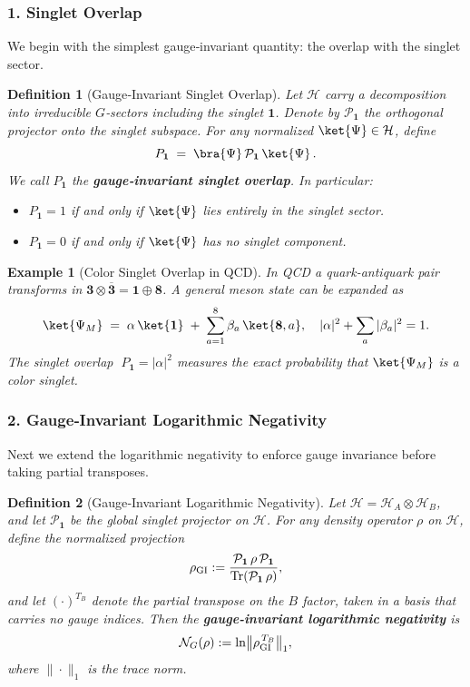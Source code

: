 \documentclass[12pt,a4paper]{article}
\newtheorem{definition}{Definition}
\newtheorem{example}{Example}
\begin{document}
\subsubsection*{1. Singlet Overlap}

We begin with the simplest gauge‐invariant quantity:
the overlap with the singlet sector.

\begin{definition}[Gauge‐Invariant Singlet Overlap]
	Let $\mathcal H$ carry a decomposition into irreducible $G$‐sectors including the singlet $\mathbf1$.
	Denote by $\mathcal P_{\mathbf1}$ the orthogonal projector onto the singlet subspace.
	For any normalized $\ket{\Psi}\in\mathcal H$, define
	\[
	P_{\mathbf1}\;=\;\bra{\Psi}\,\mathcal P_{\mathbf1}\,\ket{\Psi}\,.
	\]
	We call $P_{\mathbf1}$ the \textbf{gauge‐invariant singlet overlap}.
	In particular:
	\begin{itemize}
		\item $P_{\mathbf1}=1$ if and only if $\ket{\Psi}$ lies entirely in the singlet sector.
		
		\item $P_{\mathbf1}=0$ if and only if $\ket{\Psi}$ has no singlet component.
	\end{itemize}
\end{definition}


\begin{example}[Color Singlet Overlap in QCD]
	In QCD a quark-antiquark pair transforms in 
	$\mathbf3\otimes\overline{\mathbf3}=\mathbf1\oplus\mathbf8$.  
	A general meson state can be expanded as
	\[
	\ket{\Psi_M}
	\;=\;
	\alpha\,\ket{\mathbf1}
	\;+\;
	\sum_{a=1}^{8}\beta_{a}\,\ket{\mathbf8,a},
	\quad
	|\alpha|^2+\sum_a|\beta_a|^2=1.
	\]
	The singlet overlap
	$\;P_{\mathbf1}=|\alpha|^2$
	measures the exact probability that $\ket{\Psi_M}$ is a color singlet.
\end{example}



\subsubsection*{2. Gauge‐Invariant Logarithmic Negativity \cite{VidalWerner2002}}

Next we extend the logarithmic negativity to enforce gauge invariance before taking partial transposes.

\begin{definition}[Gauge‐Invariant Logarithmic Negativity]
	Let $\mathcal H=\mathcal H_A\otimes\mathcal H_B$, and let $\mathcal P_{\mathbf1}$ be the global singlet projector on $\mathcal H$.  For any density operator $\rho$ on $\mathcal H$, define the normalized projection
	\[
	\rho_{\rm GI}
	:=\frac{\mathcal P_{\mathbf1}\,\rho\,\mathcal P_{\mathbf1}}
	{\operatorname{Tr}(\mathcal P_{\mathbf1}\,\rho)},
	\]
	and let $(\cdot)^{T_B}$ denote the partial transpose on the $B$ factor, taken in a basis that carries no gauge indices.  Then the \textbf{gauge‐invariant logarithmic negativity} is
	\[
	\mathcal N_G(\rho)
	:=\ln\bigl\|\rho_{\rm GI}^{\,T_B}\bigr\|_1,
	\]
	where $\|\cdot\|_1$ is the trace norm.
\end{definition}
\end{document}
